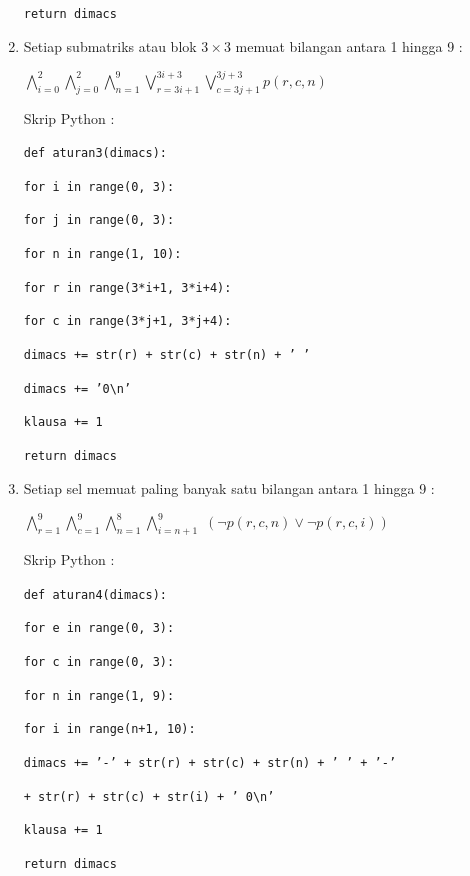 \begin{enumerate}
	\quad \quad\texttt{return dimacs}
	
	\item Setiap submatriks atau blok $3 \times 3$
	memuat bilangan antara 1 hingga 9 : 
	
	$\bigwedge_{i=0}^{2}$$\bigwedge_{j=0}^{2}$$\bigwedge_{n=1}^{9}$$\bigvee_{r=3i+1}^{3i+3}$$\bigvee_{c=3j+1}^{3j+3}$$p\left(r,c,n\right)$
	
	
	\vspace{5mm}
	
	Skrip Python :
	
	\vspace{5mm}
	
	\texttt{def aturan3(dimacs):}
	
	\quad \quad\texttt{for i in range(0, 3):}
	
	\quad \quad \quad\texttt{for j in range(0, 3):}
	
	\quad \quad \quad \quad\texttt{for n in range(1, 10):}
	
	\quad\quad\quad\quad\quad\texttt{for r in range(3*i+1, 3*i+4):}
	
	\quad\quad\quad\quad\quad\quad\texttt{for c in range(3*j+1, 3*j+4):}
	
	\quad\quad\quad\quad\quad\quad\quad\texttt{dimacs += str(r) + str(c) + str(n) + ' '}
	
	\quad\quad\quad\quad\quad\texttt{dimacs += '0\textbackslash n'}
	
	\quad\quad\quad\quad\quad\texttt{klausa += 1}
	
	\quad\quad\texttt{return dimacs}
	
	\vspace{5mm}
	
	
	\item Setiap sel memuat paling banyak satu bilangan antara 1 hingga 9 : 
	
	$\bigwedge_{r=1}^{9}$$\bigwedge_{c=1}^{9}$$\bigwedge_{n=1}^{8}$$\bigwedge_{i=n+1}^{9}$
	$\left(\neg p\left(r,c,n\right)\vee\neg p\left(r,c,i\right)\right)$
	
	
	\vspace{5mm}
	
	Skrip Python :
	
	\vspace{5mm}
	
	\texttt{def aturan4(dimacs):}
	
	\quad \quad\texttt{for e in range(0, 3):}
	
	\quad \quad \quad\texttt{for c in range(0, 3):}
	
	\quad \quad \quad \quad\texttt{for n in range(1, 9):}
	
	\quad\quad\quad\quad\quad\texttt{for i in range(n+1, 10):}
	
	\quad\quad\quad\quad\quad\quad\texttt{dimacs += '-' + str(r) + str(c) + str(n) + ' ' + '-'} 
	
	\quad\quad\quad\quad\quad\quad\texttt{+ str(r) + str(c) + str(i) + ' 0\textbackslash n'}
	
	\quad\quad\quad\quad\quad\texttt{klausa += 1}
	
	\quad \quad\texttt{return dimacs}
	
\end{enumerate}

